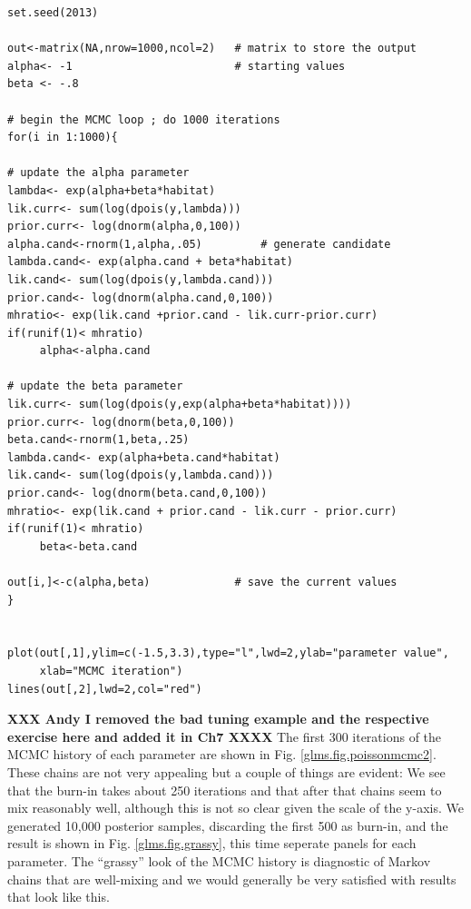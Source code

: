 {\small
\begin{verbatim}
set.seed(2013)

out<-matrix(NA,nrow=1000,ncol=2)   # matrix to store the output
alpha<- -1                         # starting values
beta <- -.8

# begin the MCMC loop ; do 1000 iterations
for(i in 1:1000){

# update the alpha parameter
lambda<- exp(alpha+beta*habitat)
lik.curr<- sum(log(dpois(y,lambda)))
prior.curr<- log(dnorm(alpha,0,100))
alpha.cand<-rnorm(1,alpha,.05)         # generate candidate
lambda.cand<- exp(alpha.cand + beta*habitat)
lik.cand<- sum(log(dpois(y,lambda.cand)))
prior.cand<- log(dnorm(alpha.cand,0,100))
mhratio<- exp(lik.cand +prior.cand - lik.curr-prior.curr)
if(runif(1)< mhratio)
     alpha<-alpha.cand

# update the beta parameter
lik.curr<- sum(log(dpois(y,exp(alpha+beta*habitat))))
prior.curr<- log(dnorm(beta,0,100))
beta.cand<-rnorm(1,beta,.25)
lambda.cand<- exp(alpha+beta.cand*habitat)
lik.cand<- sum(log(dpois(y,lambda.cand)))
prior.cand<- log(dnorm(beta.cand,0,100))
mhratio<- exp(lik.cand + prior.cand - lik.curr - prior.curr)
if(runif(1)< mhratio)
     beta<-beta.cand

out[i,]<-c(alpha,beta)             # save the current values
}


plot(out[,1],ylim=c(-1.5,3.3),type="l",lwd=2,ylab="parameter value",
     xlab="MCMC iteration")
lines(out[,2],lwd=2,col="red")
\end{verbatim}
}
{\bf XXX Andy I removed the bad tuning example and the respective exercise here and added it in Ch7 XXXX}
The first 300 iterations of the MCMC history of each parameter
are shown in Fig. \ref{glms.fig.poissonmcmc2}. These chains are
not very appealing but a couple of things are evident: 
We see
that the burn-in takes about 250 iterations and that after that chains seem to mix reasonably well, although this is not so clear given the scale of the y-axis.
We generated 10,000 posterior samples,
discarding the first 500 as burn-in, and the result is shown in
Fig. \ref{glms.fig.grassy}, this time seperate panels for each
parameter.
The ``grassy''
look of the MCMC history is diagnostic of Markov chains that are
well-mixing and we would generally be very satisfied with results that
look like this.

